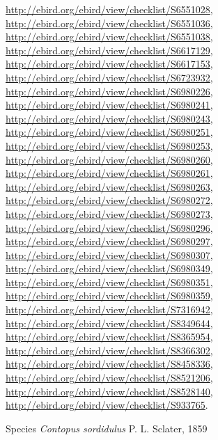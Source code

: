 \documentclass[9pt, article]{memoir}
\begin{document}
\begin{multicols}{2}
\url{http://ebird.org/ebird/view/checklist/S6551028}, 
\url{http://ebird.org/ebird/view/checklist/S6551036}, 
\url{http://ebird.org/ebird/view/checklist/S6551038}, 
\url{http://ebird.org/ebird/view/checklist/S6617129}, 
\url{http://ebird.org/ebird/view/checklist/S6617153}, 
\url{http://ebird.org/ebird/view/checklist/S6723932}, 
\url{http://ebird.org/ebird/view/checklist/S6980226}, 
\url{http://ebird.org/ebird/view/checklist/S6980241}, 
\url{http://ebird.org/ebird/view/checklist/S6980243}, 
\url{http://ebird.org/ebird/view/checklist/S6980251}, 
\url{http://ebird.org/ebird/view/checklist/S6980253}, 
\url{http://ebird.org/ebird/view/checklist/S6980260}, 
\url{http://ebird.org/ebird/view/checklist/S6980261}, 
\url{http://ebird.org/ebird/view/checklist/S6980263}, 
\url{http://ebird.org/ebird/view/checklist/S6980272}, 
\url{http://ebird.org/ebird/view/checklist/S6980273}, 
\url{http://ebird.org/ebird/view/checklist/S6980296}, 
\url{http://ebird.org/ebird/view/checklist/S6980297}, 
\url{http://ebird.org/ebird/view/checklist/S6980307}, 
\url{http://ebird.org/ebird/view/checklist/S6980349}, 
\url{http://ebird.org/ebird/view/checklist/S6980351}, 
\url{http://ebird.org/ebird/view/checklist/S6980359}, 
\url{http://ebird.org/ebird/view/checklist/S7316942}, 
\url{http://ebird.org/ebird/view/checklist/S8349644}, 
\url{http://ebird.org/ebird/view/checklist/S8365954}, 
\url{http://ebird.org/ebird/view/checklist/S8366302}, 
\url{http://ebird.org/ebird/view/checklist/S8458336}, 
\url{http://ebird.org/ebird/view/checklist/S8521206}, 
\url{http://ebird.org/ebird/view/checklist/S8528140}, 
\url{http://ebird.org/ebird/view/checklist/S933765}.

\vspace{6pt}\noindent\hspace{36pt}Species \textit{Contopus sordidulus} P. L. Sclater, 1859



\end{multicols}
\end{document}
